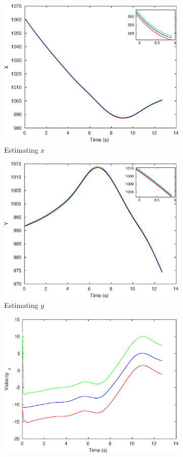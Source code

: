 \begin{figure}[h!]
\begin{subfigure}{.5\textwidth}
\centering
\includegraphics[width=.8\linewidth]{figures/s_caXzoomed}
\caption{Estimating $x$}
\end{subfigure}
\begin{subfigure}{.5\textwidth}
\centering
\includegraphics[width=.8\linewidth]{figures/s_caYzoomed}
\caption{Estimating $y$}
\end{subfigure}
\begin{subfigure}{.5\textwidth}
\centering
\includegraphics[width=.8\linewidth]{figures/s_caVelocity_x}

\end{subfigure}
\end{figure}
